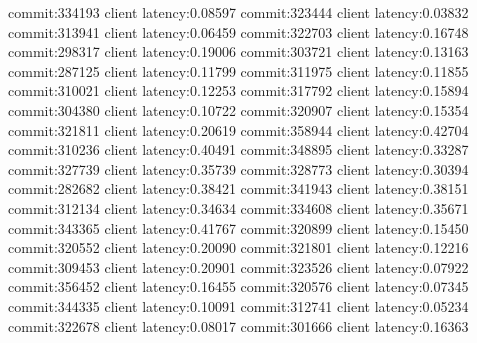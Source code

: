commit:334193 client latency:0.08597
commit:323444 client latency:0.03832
commit:313941 client latency:0.06459
commit:322703 client latency:0.16748
commit:298317 client latency:0.19006
commit:303721 client latency:0.13163
commit:287125 client latency:0.11799
commit:311975 client latency:0.11855
commit:310021 client latency:0.12253
commit:317792 client latency:0.15894
commit:304380 client latency:0.10722
commit:320907 client latency:0.15354
commit:321811 client latency:0.20619
commit:358944 client latency:0.42704
commit:310236 client latency:0.40491
commit:348895 client latency:0.33287
commit:327739 client latency:0.35739
commit:328773 client latency:0.30394
commit:282682 client latency:0.38421
commit:341943 client latency:0.38151
commit:312134 client latency:0.34634
commit:334608 client latency:0.35671
commit:343365 client latency:0.41767
commit:320899 client latency:0.15450
commit:320552 client latency:0.20090
commit:321801 client latency:0.12216
commit:309453 client latency:0.20901
commit:323526 client latency:0.07922
commit:356452 client latency:0.16455
commit:320576 client latency:0.07345
commit:344335 client latency:0.10091
commit:312741 client latency:0.05234
commit:322678 client latency:0.08017
commit:301666 client latency:0.16363
